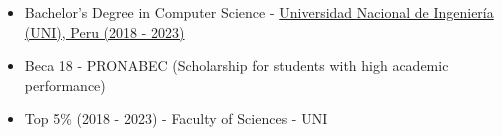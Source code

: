 %
%
%




\twocolumnsection
{
\vspace{1em}
\begin{itemize}
    \item Bachelor's Degree in Computer Science - \href{https://www.uni.edu.pe/}{Universidad Nacional de Ingeniería (UNI), Peru (2018 - 2023)}
\end{itemize}
}
{
\vspace{1em}
\begin{itemize}
\item Beca 18 - PRONABEC (Scholarship for students with high academic performance)
\item Top 5\% (2018 - 2023) - Faculty of Sciences - UNI 
\end{itemize}
}
